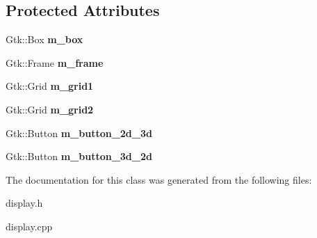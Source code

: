 \subsection*{Protected Attributes}
\begin{DoxyCompactItemize}
\item 
Gtk\+::\+Box {\bfseries m\+\_\+box}\hypertarget{classMainWindow_ae9ef6a369c5adf6251cfcf8f6758b73d}{}\label{classMainWindow_ae9ef6a369c5adf6251cfcf8f6758b73d}

\item 
Gtk\+::\+Frame {\bfseries m\+\_\+frame}\hypertarget{classMainWindow_a8214cb1454a3434209091c9771205356}{}\label{classMainWindow_a8214cb1454a3434209091c9771205356}

\item 
Gtk\+::\+Grid {\bfseries m\+\_\+grid1}\hypertarget{classMainWindow_ad01fcce6ca67accc2b0cc8c3c512cbc2}{}\label{classMainWindow_ad01fcce6ca67accc2b0cc8c3c512cbc2}

\item 
Gtk\+::\+Grid {\bfseries m\+\_\+grid2}\hypertarget{classMainWindow_aeb023cb55e597ee1a0f0bf834944b127}{}\label{classMainWindow_aeb023cb55e597ee1a0f0bf834944b127}

\item 
Gtk\+::\+Button {\bfseries m\+\_\+button\+\_\+2d\+\_\+3d}\hypertarget{classMainWindow_a8746093c37f47022c2999c2f806464b0}{}\label{classMainWindow_a8746093c37f47022c2999c2f806464b0}

\item 
Gtk\+::\+Button {\bfseries m\+\_\+button\+\_\+3d\+\_\+2d}\hypertarget{classMainWindow_a0fb9c6d7aa1f9ac304ff16a16cc1650e}{}\label{classMainWindow_a0fb9c6d7aa1f9ac304ff16a16cc1650e}

\end{DoxyCompactItemize}


The documentation for this class was generated from the following files\+:\begin{DoxyCompactItemize}
\item 
display.\+h\item 
display.\+cpp\end{DoxyCompactItemize}
